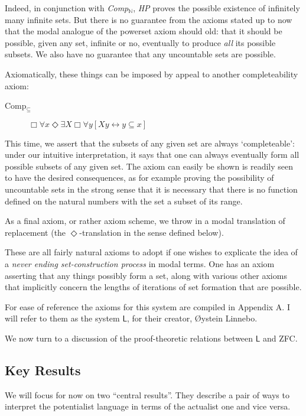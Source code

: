 \documentclass{article}
\begin{document}
Indeed, in conjunction with \emph{Comp$_\mathbb{N}$}, 
\emph{HP} proves the possible existence of infinitely many
infinite sets. But there is no guarantee from the axioms stated up to now that 
the modal analogue of the powerset axiom should old: that it should be possible, 
given any set, infinite or no, eventually to produce \emph{all} its possible subsets. 
We also have no guarantee that any uncountable sets are possible.

Axiomatically, these things can be imposed by appeal to another completeability axiom:
\begin{description}
    \item[Comp$_\subseteq$]
    $\Box \forall x \Diamond \exists X \Box \forall y[ Xy \leftrightarrow y \subseteq x]$
\end{description}
This time, we assert that the subsets of any given set are always `completeable': 
under our intuitive interpretation, 
it says that one can always eventually form all possible subsets of any given set. 
The axiom can easily be shown is readily seen to have the desired consequences, as 
for example proving the possibility of uncountable sets in the strong sense that 
it is necessary that there is no function defined on the natural numbers with the set 
a subset of its range.

As a final axiom, or rather axiom scheme, we throw in a modal 
translation of replacement (the $\Diamond$-translation in the sense defined below).

These are all fairly natural axioms to adopt if one wishes to explicate the idea 
of a \emph{never ending set-construction process} in modal terms. One has an axiom 
asserting that any things possibly form a set, along with various other axioms 
that implicitly concern the lengths of iterations of set formation that are possible.

For ease of reference the axioms 
for this system are compiled in Appendix A. I will refer to them as the system $\mathsf{L}$,
for their creator, \O ystein Linnebo.

We now turn to a discussion of the proof-theoretic relations between $\mathsf{L}$
and ZFC. 
\subsection{Key Results}
We will focus for now on two ``central results''. They describe a pair of ways 
to interpret the potentialist language in terms of the actualist one and vice versa.
\end{document}
